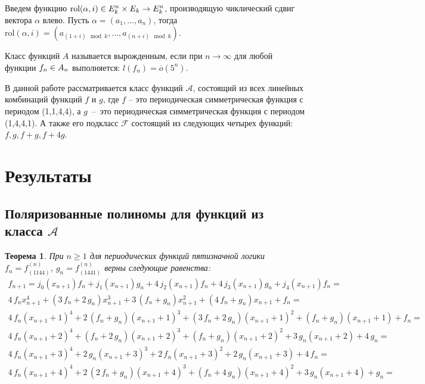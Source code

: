 \documentclass[bibliography=totoc, a4paper, 14pt]{extarticle}
\newtheorem{myth}{Теорема}
\newcommand{\rol} {\textrm{rol}}
\def\times{\mathchar8706\nobreak\discretionary{}{\usefont{OMS}{cmsy}{m}{n}\char2}{}}
\def\in{\mathchar"3232\nobreak\discretionary{}{\usefont{OMS}{cmsy}{m}{n}\char50}{}}
\begin{document}
Введем функцию $\rol(\alpha, i) \in E_k^n \times E_k \rightarrow E_k^n$, производящую чиклический сдвиг вектора $\alpha$
влево. Пусть $\alpha = (a_1, \dots, a_n)$, тогда $\rol(\alpha, i) = (a_{(1+i)\mod k}, \dots, a_{(n+i)\mod k})$.

Класс функций $A$ называется вырожденным, если при $n \rightarrow \infty$ для любой функции
${f_n \in A_n}$ выполняется: $l(f_n) = \overline{o}(5^n)$.

В данной работе рассматривается класс функций $\mathcal{A}$, состоящий из всех линейных комбинаций
функций $f$ и $g$, где $f$ -- это периодическая симметрическая функция с периодом (1,1,4,4), а
\mbox{$g$ -- это} периодическая симметрическая функция с периодом (1,4,4,1). А также его подкласс
$\mathcal{F}$ состоящий из следующих четырех функций: $f,g,f+g,f+4g$.

\section{Результаты}
\subsection{Поляризованные полиномы для функций из класса $\mathcal{A}$}

\begin{myth} При $n \geqslant 1 $ для периодических функций пятизначной логики $f_n = f^{\left(n\right)}_{\left(1144\right)}$,
$g_n = f^{\left(n\right)}_{\left(1441\right)}$ верны следующие равенства:
$$\begin{array}{l}
 f_{n+1} = j_0(x_{n+1})f_n + j_1(x_{n+1})g_n + 4\,j_2(x_{n+1})f_n + 4\,j_3(x_{n+1})g_n + j_4(x_{n+1})f_n =\\
4 \, f_{n} x_{n+1}^{4} + {\left(3 \, f_{n} + 2 \, g_{n}\right)} x_{n+1}^{3} + 3 \, {\left(f_{n} + g_{n}\right)} x_{n+1}^{2} + {\left(4 \, f_{n} + g_{n}\right)} x_{n+1} + f_{n}=\\
4 \, f_{n} {\left(x_{n+1} + 1\right)}^{4} + 2 \, {\left(f_{n} + g_{n}\right)} {\left(x_{n+1} + 1\right)}^{3} + {\left(3 \, f_{n} + 2 \, g_{n}\right)} {\left(x_{n+1} + 1\right)}^{2} + {\left(f_{n} + g_{n}\right)} {\left(x_{n+1} + 1\right)} + f_{n}=\\
4 \, f_{n} {\left(x_{n+1} + 2\right)}^{4} + {\left(f_{n} + 2 \, g_{n}\right)} {\left(x_{n+1} + 2\right)}^{3} + {\left(f_{n} + g_{n}\right)} {\left(x_{n+1} + 2\right)}^{2} + 3 \, g_{n} {\left(x_{n+1} + 2\right)} + 4 \, g_{n}=\\
4 \, f_{n} {\left(x_{n+1} + 3\right)}^{4} + 2 \, g_{n} {\left(x_{n+1} + 3\right)}^{3} + 2 \, f_{n} {\left(x_{n+1} + 3\right)}^{2} + 2 \, g_{n} {\left(x_{n+1} + 3\right)} + 4 \, f_{n}=\\
4 \, f_{n} {\left(x_{n+1} + 4\right)}^{4} + 2 \, {\left(2 \, f_{n} + g_{n}\right)} {\left(x_{n+1} + 4\right)}^{3} + {\left(f_{n} + 4 \, g_{n}\right)} {\left(x_{n+1} + 4\right)}^{2} + 3 \, g_{n} {\left(x_{n+1} + 4\right)} + g_{n}=\\
\end{array}$$
\end{myth}
\end{document}
